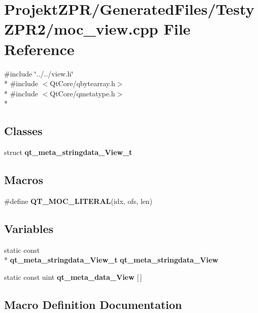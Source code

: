 \section{Projekt\-Z\-P\-R/\-Generated\-Files/\-Testy\-Z\-P\-R2/moc\-\_\-view.cpp File Reference}
\label{_testy_z_p_r2_2moc__view_8cpp}
{\ttfamily \#include \char`\"{}../../view.\-h\char`\"{}}\\*
{\ttfamily \#include $<$Qt\-Core/qbytearray.\-h$>$}\\*
{\ttfamily \#include $<$Qt\-Core/qmetatype.\-h$>$}\\*
\subsection*{Classes}
\begin{DoxyCompactItemize}
\item 
struct {\bf qt\-\_\-meta\-\_\-stringdata\-\_\-\-View\-\_\-t}
\end{DoxyCompactItemize}
\subsection*{Macros}
\begin{DoxyCompactItemize}
\item 
\#define {\bf Q\-T\-\_\-\-M\-O\-C\-\_\-\-L\-I\-T\-E\-R\-A\-L}(idx, ofs, len)
\end{DoxyCompactItemize}
\subsection*{Variables}
\begin{DoxyCompactItemize}
\item 
static const \\*
{\bf qt\-\_\-meta\-\_\-stringdata\-\_\-\-View\-\_\-t} {\bf qt\-\_\-meta\-\_\-stringdata\-\_\-\-View}
\item 
static const uint {\bf qt\-\_\-meta\-\_\-data\-\_\-\-View} [$\,$]
\end{DoxyCompactItemize}


\subsection{Macro Definition Documentation}
